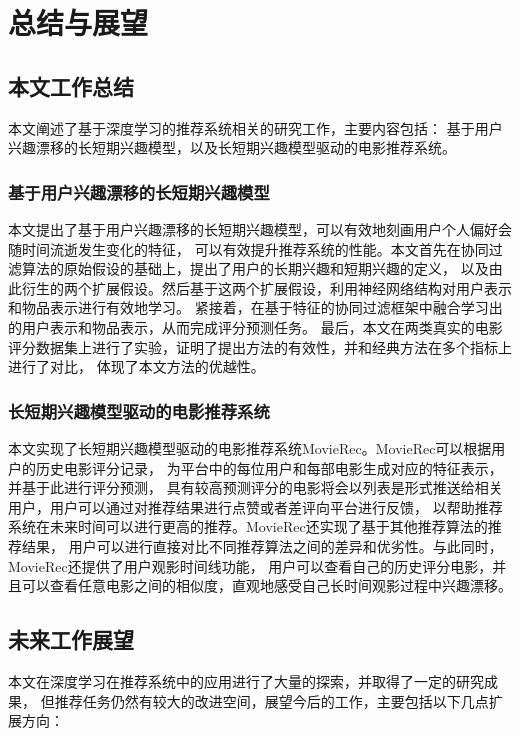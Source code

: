 \chapter{总结与展望}
\section{本文工作总结}
本文阐述了基于深度学习的推荐系统相关的研究工作，主要内容包括：
基于用户兴趣漂移的长短期兴趣模型，以及长短期兴趣模型驱动的电影推荐系统。

\subsection{基于用户兴趣漂移的长短期兴趣模型}
本文提出了基于用户兴趣漂移的长短期兴趣模型，可以有效地刻画用户个人偏好会随时间流逝发生变化的特征，
可以有效提升推荐系统的性能。本文首先在协同过滤算法的原始假设的基础上，提出了用户的长期兴趣和短期兴趣的定义，
以及由此衍生的两个扩展假设。然后基于这两个扩展假设，利用神经网络结构对用户表示和物品表示进行有效地学习。
紧接着，在基于特征的协同过滤框架中融合学习出的用户表示和物品表示，从而完成评分预测任务。
最后，本文在两类真实的电影评分数据集上进行了实验，证明了提出方法的有效性，并和经典方法在多个指标上进行了对比，
体现了本文方法的优越性。

\subsection{长短期兴趣模型驱动的电影推荐系统}
本文实现了长短期兴趣模型驱动的电影推荐系统MovieRec。MovieRec可以根据用户的历史电影评分记录，
为平台中的每位用户和每部电影生成对应的特征表示，并基于此进行评分预测，
具有较高预测评分的电影将会以列表是形式推送给相关用户，用户可以通过对推荐结果进行点赞或者差评向平台进行反馈，
以帮助推荐系统在未来时间可以进行更高的推荐。MovieRec还实现了基于其他推荐算法的推荐结果，
用户可以进行直接对比不同推荐算法之间的差异和优劣性。与此同时，MovieRec还提供了用户观影时间线功能，
用户可以查看自己的历史评分电影，并且可以查看任意电影之间的相似度，直观地感受自己长时间观影过程中兴趣漂移。

\section{未来工作展望}
本文在深度学习在推荐系统中的应用进行了大量的探索，并取得了一定的研究成果，
但推荐任务仍然有较大的改进空间，展望今后的工作，主要包括以下几点扩展方向：

